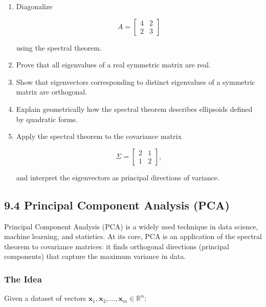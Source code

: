\documentclass[
  12pt,
  a4paper,
]{article}
\begin{document}
\begin{enumerate}
\def\labelenumi{\arabic{enumi}.}
\item
  Diagonalize

  \[A = \begin{bmatrix} 4 & 2 \\ 2 & 3 \end{bmatrix}\]

  using the spectral theorem.
\item
  Prove that all eigenvalues of a real symmetric matrix are real.
\item
  Show that eigenvectors corresponding to distinct eigenvalues of a
  symmetric matrix are orthogonal.
\item
  Explain geometrically how the spectral theorem describes ellipsoids
  defined by quadratic forms.
\item
  Apply the spectral theorem to the covariance matrix

  \[\Sigma = \begin{bmatrix} 2 & 1 \\ 1 & 2 \end{bmatrix},\]

  and interpret the eigenvectors as principal directions of variance.
\end{enumerate}

\subsection{9.4 Principal Component Analysis
(PCA)}\label{94-principal-component-analysis-pca}

Principal Component Analysis (PCA) is a widely used technique in data
science, machine learning, and statistics. At its core, PCA is an
application of the spectral theorem to covariance matrices: it finds
orthogonal directions (principal components) that capture the maximum
variance in data.

\subsubsection{The Idea}\label{the-idea-2}

Given a dataset of vectors
\(\mathbf{x}_1, \mathbf{x}_2, \dots, \mathbf{x}_m \in \mathbb{R}^n\):
\end{document}
